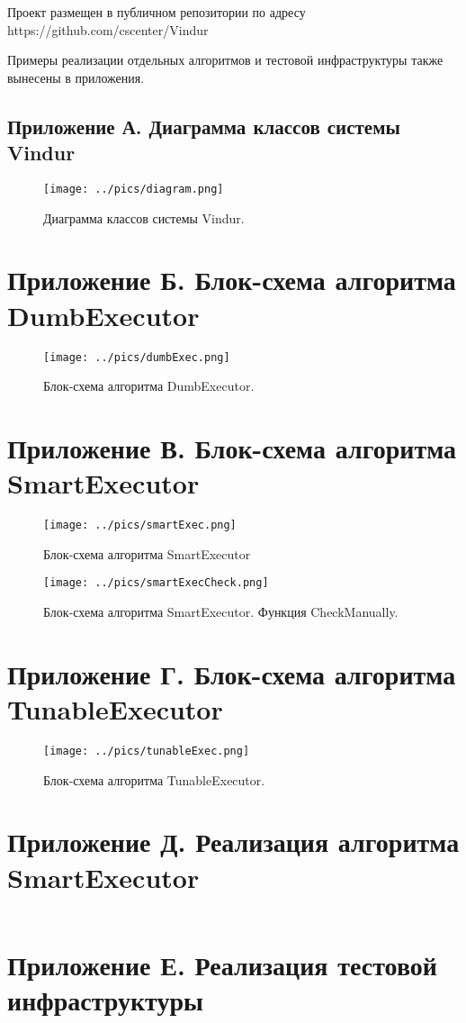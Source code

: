 \documentclass{matmex-diploma}
\begin{document}
    Проект размещен в публичном репозитории по адресу https://github.com/cscenter/Vindur
    
    Примеры реализации отдельных алгоритмов и тестовой инфраструктуры также вынесены в приложения.




\begin{landscape}
    \thispagestyle{empty}
    \section*{Приложение А. Диаграмма классов системы Vindur}
        \begin{figure}[H]
            \label{classes}
            \centering
            \texttt{[image: ../pics/diagram.png]}
            \caption{Диаграмма классов системы Vindur.}
        \end{figure}
\end{landscape}

\section*{Приложение Б. Блок-схема алгоритма DumbExecutor}
    \begin{figure}[H]
        \label{dumbAlgo}
        \centering
        \texttt{[image: ../pics/dumbExec.png]}
        \caption{Блок-схема алгоритма DumbExecutor.}
    \end{figure}
\section*{Приложение В. Блок-схема алгоритма SmartExecutor}
    \begin{figure}[H]
        \centering
        \texttt{[image: ../pics/smartExec.png]}
        \caption{Блок-схема алгоритма SmartExecutor}
        \label{smartAlgo}
    \end{figure}
    \begin{figure}[H]
        \centering
        \texttt{[image: ../pics/smartExecCheck.png]}
        \caption{Блок-схема алгоритма SmartExecutor. Функция CheckManually.}
        \label{smartCheck}
    \end{figure}
\section*{Приложение Г. Блок-схема алгоритма TunableExecutor}
    \begin{figure}[H]
        \centering
        \texttt{[image: ../pics/tunableExec.png]}
        \caption{Блок-схема алгоритма TunableExecutor.}
        \label{smartCheck}
    \end{figure}
\section*{Приложение Д. Реализация алгоритма SmartExecutor}
    \inputminted[breaklines=true]{java}{../sources/SmartExecutor.java}
\section*{Приложение Е. Реализация тестовой инфраструктуры}
    \inputminted[breaklines=true]{java}{../sources/TuningTest.java}
\end{document}
